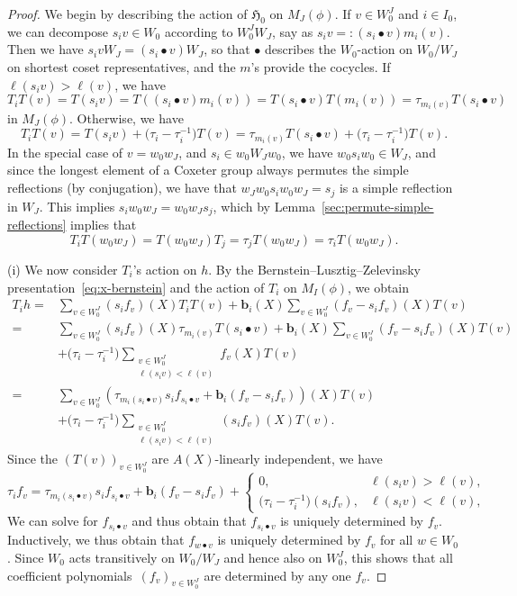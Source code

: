 \documentclass[pdftex]{sigma}
\theoremstyle{definition}
\numberwithin{equation}{section}
\begin{document}
\begin{proof}
 We begin by describing the action of $\mathfrak{H}_0$ on $M_J(\phi)$.
 If $v\in W_0^J$ and $i\in I_0$, we can decompose $s_iv\in W_0$ according
 to $W_0^J W_J$, say as
$s_i v =: (s_i\bullet v) m_i(v)$.
 Then we have $s_i vW_J= (s_i\bullet v)W_J$, so that $\bullet$ describes
 the $W_0$-action on $W_0/W_J$ on shortest coset representatives,
 and the $m$'s provide the cocycles. If $\ell(s_iv)>\ell(v)$, we have
 \[
 T_i T(v) = T(s_iv) = T((s_i\bullet v) m_i(v))
 = T(s_i\bullet v) T(m_i(v))
 = \tau_{m_i(v)} T(s_i\bullet v)
 \]
 in $M_J(\phi)$. Otherwise, we have
 \[
 T_i T(v) = T(s_iv) + \bigl(\tau_i - \tau_i^{-1}\bigr)
 T(v)
 = \tau_{m_i(v)} T(s_i\bullet v)
 + \bigl(\tau_i - \tau_i^{-1}\bigr) T(v).
 \]
 In the special case of $v=w_0w_J$, and $s_i\in w_0W_Jw_0$, we have
 $w_0 s_i w_0\in W_J$, and since the longest element of a Coxeter group
 always permutes the simple reflections (by conjugation), we have that
 $w_J w_0 s_i w_0 w_J = s_j$ is a simple reflection in $W_J$. This implies
$
 s_i w_0 w_J = w_0 w_J s_j$,
 which by Lemma~\ref{sec:permute-simple-reflections} implies that
 \[
 T_i T(w_0w_J) = T(w_0w_J) T_j = \tau_j T(w_0w_J)
 = \tau_i T(w_0w_J).
 \]

(i) We now consider $T_i$'s action on $h$. By the Bernstein--Lusztig--Zelevinsky
 presentation~\eqref{eq:x-bernstein} and the action of $T_i$ on $M_I(\phi)$, we obtain
 \begin{align*}
 T_i h ={}& \sum_{v\in W_0^J} (s_i f_v)(X) T_i T(v)
 + \bm{b}_i(X) \sum_{v\in W_0^J} (f_v-s_if_v)(X) T(v)\\
 ={}& \sum_{v\in W_0^J} (s_i f_v)(X) \tau_{m_i(v)} T(s_i\bullet v)
 + \bm{b}_i(X) \sum_{v\in W_0^J} (f_v-s_if_v)(X) T(v)\\
 &+ \bigl(\tau_i-\tau_i^{-1}\bigr)\sum_{\substack{v\in W_0^J\\\ell(s_iv)<\ell(v)}} f_v(X) T(v)\\
 ={}& \sum_{v\in W_0^J} (\tau_{m_i(s_i\bullet v)} s_i f_{s_i\bullet v} + \bm{b}_i (f_v-s_if_v))(X) T(v)\\
 &+ \bigl(\tau_i-\tau_i^{-1}\bigr)\sum_{\substack{v\in W_0^J\\\ell(s_iv)<\ell(v)}} (s_if_v)(X) T(v).
 \end{align*}
 Since the $(T(v))_{v\in W_0^J}$ are $A(X)$-linearly independent, we have
 \[
 \tau_i f_v = \tau_{m_i(s_i\bullet v)}
 s_i f_{s_i\bullet v} + \bm{b}_i(f_v-s_if_v)
 + \begin{cases}
 0, & \ell(s_iv)>\ell(v),\\
 \bigl(\tau_i-\tau_i^{-1}\bigr)(s_if_v), & \ell(s_iv)<\ell(v),
 \end{cases}
 \]
 We can solve for $f_{s_i\bullet v}$ and thus obtain that
 $f_{s_i\bullet v}$ is uniquely determined by $f_v$. Inductively, we thus
 obtain that $f_{w\bullet v}$ is uniquely determined by $f_v$ for all
 $w\in W_0$. Since $W_0$ acts transitively on $W_0/W_J$ and hence also
 on $W_0^J$, this shows that all coefficient polynomials~$(f_v)_{v\in W_0^J}$ are
 determined by any one $f_v$.


\end{proof}
\end{document}
